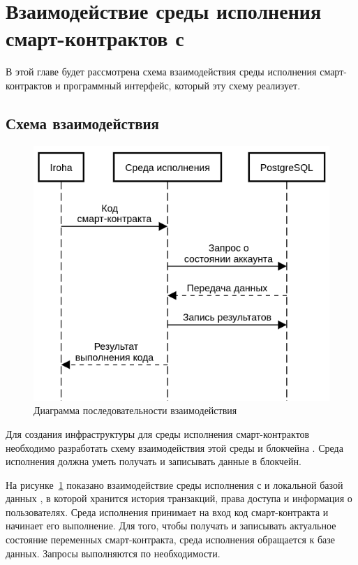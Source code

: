 \section{Взаимодействие среды исполнения смарт-кон\-трак\-тов с }
В этой главе будет рассмотрена схема взаимодействия среды исполнения смарт-кон\-трак\-тов и программный интерфейс, который эту схему реализует.

\subsection{Схема взаимодействия}
\label{Interaction}

\begin{figure}[b!]
  \centering
  \includegraphics[width=0.6\columnwidth]{interaction.png}
  \caption{Диаграмма последовательности взаимодействия}
  \label{interaction}
\end{figure}

Для создания инфраструктуры для среды исполнения смарт-кон\-трак\-тов необходимо разработать схему взаимодействия этой среды и блокчейна .
Среда исполнения должна уметь получать и записывать данные в блокчейн.

На рисунке~\ref{interaction} показано взаимодействие среды исполнения с  и локальной базой данных , в которой хранится история транзакций, права доступа и информация о пользователях.
Среда исполнения принимает на вход код смарт-контракта и начинает его выполнение.
Для того, чтобы получать и записывать актуальное состояние переменных смарт-контракта, среда исполнения обращается к базе данных.
Запросы выполняются по необходимости.

